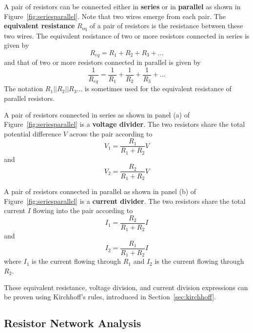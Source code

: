 \documentclass[11pt]{article}
\begin{document}
A pair of resistors can be connected either in \textbf{series} or in
\textbf{parallel} as shown in Figure~\ref{fig:seriesparallel}.  Note
that two wires emerge from each pair. The \textbf{equivalent
  resistance} $R_\mathrm{eq}$ of a pair of resistors is the resistance
between these two wires. The equivalent resistance of two or more
resistors connected in series is given by
\begin{equation}
  R_{eq} = R_1 + R_2 + R_3 + \ldots
  \label{eq:Rseries}
\end{equation}
and that of two or more resistors connected in parallel is given by
\begin{equation}
  \frac{1}{R_{eq}} = \frac{1}{R_1} + \frac{1}{R_2} + \frac{1}{R_3} +
  \ldots
  \label{eq:Rparallel}
\end{equation}
The notation $R_1||R_2||R_3...$ is sometimes used for the equivalent
resistance of parallel resistors.

A pair of resistors connected in series as shown in panel (a) of
Figure~\ref{fig:seriesparallel} is a \textbf{voltage divider}. The two
resistors share the total potential difference $V$ across the pair
according to
\begin{equation}
  \label{eq:Vdiv}
  V_1 = \frac{R_1}{R_1 + R_2} V
\end{equation}
and
\begin{equation}
  \label{eq:Vdiv2}
  V_2 = \frac{R_2}{R_1 + R_2} V
\end{equation}

A pair of resistors connected in parallel as shown in panel (b) of
Figure~\ref{fig:seriesparallel} is a \textbf{current divider}. The two
resistors share the total current $I$ flowing into the pair according
to
\begin{equation}
  \label{eq:Idiv}
  I_1 = \frac{R_2}{R_1 + R_2} I
\end{equation}
and
\begin{equation}
  \label{eq:Idiv2}
  I_2 = \frac{R_1}{R_1 + R_2} I
\end{equation}
where $I_1$ is the current flowing through $R_1$ and $I_2$ is the
current flowing through $R_2$.

These equivalent resistance, voltage division, and current division
expressions can be proven using Kirchhoff's rules, introduced in
Section~\ref{sec:kirchhoff}.

\subsection{Resistor Network Analysis}
\label{sec:rnetwork}
\end{document}
